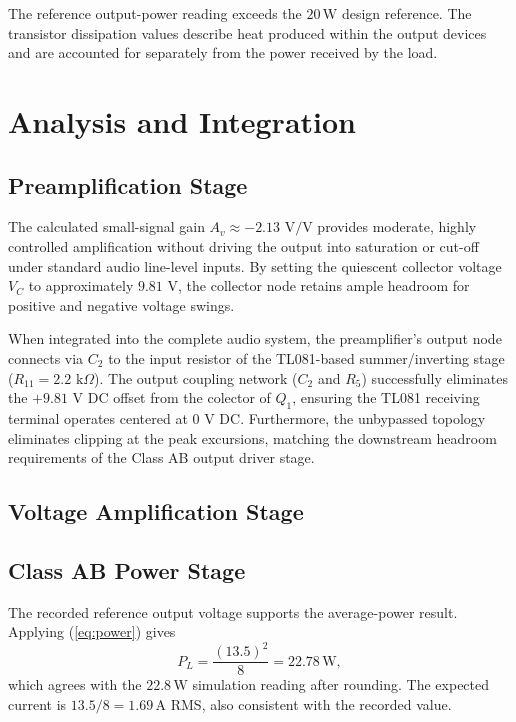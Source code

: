 \documentclass[conference,letterpaper]{IEEEtran}
\newcommand{\A}{\mathrm{A}}
\newcommand{\W}{\mathrm{W}}
\begin{document}
The reference output-power reading exceeds the $20\,\W$ design reference.
The transistor dissipation values describe heat produced within the
output devices and are accounted for separately from the power
received by the load.

\section{Analysis and Integration}
\subsection{Preamplification Stage}
The calculated small-signal gain $A_v \approx -2.13\text{~V/V}$ provides moderate, highly controlled amplification without driving the output into saturation or cut-off under standard audio line-level inputs. By setting the quiescent collector voltage $V_C$ to approximately $9.81\text{~V}$, the collector node retains ample headroom for positive and negative voltage swings.

When integrated into the complete audio system, the preamplifier's output node connects via $C_2$ to the input resistor of the TL081-based summer/inverting stage ($R_{11} = 2.2\text{~k}\Omega$). The output coupling network ($C_2$ and $R_5$) successfully eliminates the $+9.81\text{~V}$ DC offset from the colector of $Q_1$, ensuring the TL081 receiving terminal operates centered at $0\text{~V}$ DC. Furthermore, the unbypassed topology eliminates clipping at the peak excursions, matching the downstream headroom requirements of the Class AB output driver stage.

\subsection{Voltage Amplification Stage}

\subsection{Class AB Power Stage}

The recorded reference output voltage supports the average-power result.
Applying (\ref{eq:power}) gives
\begin{equation}
P_L=\frac{(13.5)^2}{8}=22.78\,\W,
\end{equation}
which agrees with the $22.8\,\W$ simulation reading after rounding.
The expected current is $13.5/8=1.69\,\A$ RMS, also consistent
with the recorded value.
\end{document}
